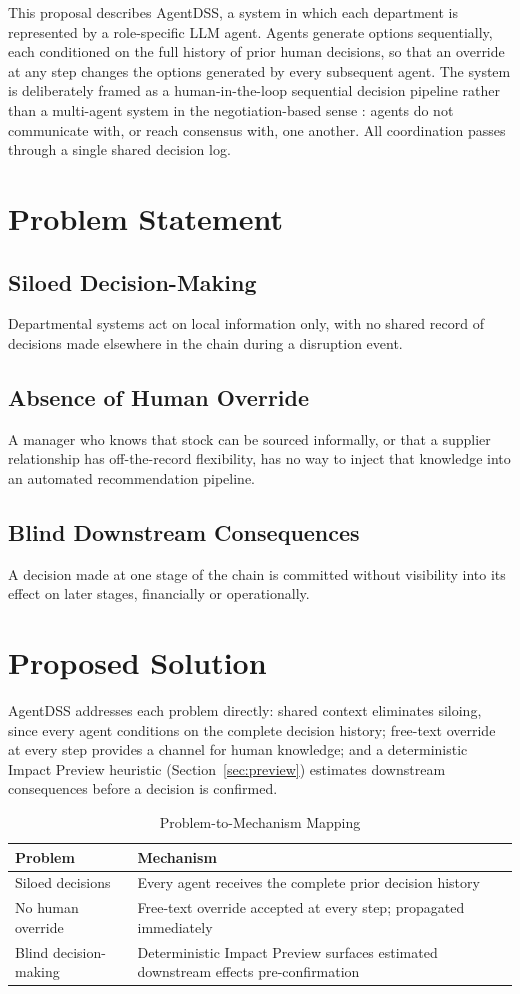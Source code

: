 \documentclass[conference]{IEEEtran}
\begin{document}
This proposal describes AgentDSS, a system in which each department is represented by a role-specific LLM agent. Agents generate options sequentially, each conditioned on the full history of prior human decisions, so that an override at any step changes the options generated by every subsequent agent. The system is deliberately framed as a human-in-the-loop sequential decision pipeline rather than a multi-agent system in the negotiation-based sense \cite{guo2024}: agents do not communicate with, or reach consensus with, one another. All coordination passes through a single shared decision log.

\section{Problem Statement}
\subsection{Siloed Decision-Making}
Departmental systems act on local information only, with no shared record of decisions made elsewhere in the chain during a disruption event.
\subsection{Absence of Human Override}
A manager who knows that stock can be sourced informally, or that a supplier relationship has off-the-record flexibility, has no way to inject that knowledge into an automated recommendation pipeline.
\subsection{Blind Downstream Consequences}
A decision made at one stage of the chain is committed without visibility into its effect on later stages, financially or operationally.

\section{Proposed Solution}
AgentDSS addresses each problem directly: shared context eliminates siloing, since every agent conditions on the complete decision history; free-text override at every step provides a channel for human knowledge; and a deterministic Impact Preview heuristic (Section~\ref{sec:preview}) estimates downstream consequences before a decision is confirmed.

\begin{table}[h]
\centering
\caption{Problem-to-Mechanism Mapping}
\begin{tabular}{p{3.8cm}p{3.8cm}}
\toprule
\textbf{Problem} & \textbf{Mechanism} \\
\midrule
Siloed decisions & Every agent receives the complete prior decision history \\
No human override & Free-text override accepted at every step; propagated immediately \\
Blind decision-making & Deterministic Impact Preview surfaces estimated downstream effects pre-confirmation \\
\bottomrule
\end{tabular}
\end{table}
\end{document}

